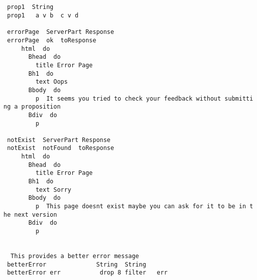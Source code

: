 \documentclass{article}
\begin{document}
\begin{tabbing}
\tt ~~~~~~~~~~~\\
\tt ~\\
\tt ~prop1~~String\\
\tt ~prop1~~~a~v~b~~c~v~d\\
\tt ~\\
\tt ~errorPage~~ServerPart~Response\\
\tt ~errorPage~~ok~~toResponse~\\
\tt ~~~~~html~~do\\
\tt ~~~~~~~Bhead~~do\\
\tt ~~~~~~~~~title~Error~Page\\
\tt ~~~~~~~Bh1~~do\\
\tt ~~~~~~~~~text~Oops\\
\tt ~~~~~~~Bbody~~do\\
\tt ~~~~~~~~~p~~It~seems~you~tried~to~check~your~feedback~without~submitting~a~proposition\\
\tt ~~~~~~~Bdiv~~do\\
\tt ~~~~~~~~~p~~\\
\tt ~\\
\tt ~notExist~~ServerPart~Response\\
\tt ~notExist~~notFound~~toResponse~\\
\tt ~~~~~html~~do\\
\tt ~~~~~~~Bhead~~do\\
\tt ~~~~~~~~~title~Error~Page\\
\tt ~~~~~~~Bh1~~do\\
\tt ~~~~~~~~~text~Sorry\\
\tt ~~~~~~~Bbody~~do\\
\tt ~~~~~~~~~p~~This~page~doesnt~exist~maybe~you~can~ask~for~it~to~be~in~the~next~version\\
\tt ~~~~~~~Bdiv~~do\\
\tt ~~~~~~~~~p~~\\
\tt ~\\
\tt ~\\
\tt ~~This~provides~a~better~error~message\\
\tt ~betterError~~~~~~~~~~~~~~String~~String\\
\tt ~betterError~err~~~~~~~~~~~drop~8~filter~~~err
\end{tabbing}
\end{document}
